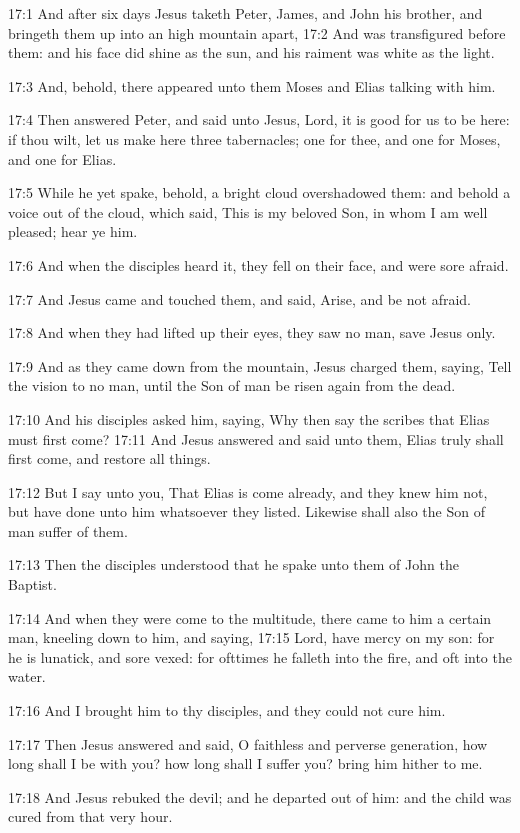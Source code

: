 17:1 And after six days Jesus taketh Peter, James, and John his
brother, and bringeth them up into an high mountain apart, 17:2 And
was transfigured before them: and his face did shine as the sun, and
his raiment was white as the light.

17:3 And, behold, there appeared unto them Moses and Elias talking
with him.

17:4 Then answered Peter, and said unto Jesus, Lord, it is good for us
to be here: if thou wilt, let us make here three tabernacles; one for
thee, and one for Moses, and one for Elias.

17:5 While he yet spake, behold, a bright cloud overshadowed them: and
behold a voice out of the cloud, which said, This is my beloved Son,
in whom I am well pleased; hear ye him.

17:6 And when the disciples heard it, they fell on their face, and
were sore afraid.

17:7 And Jesus came and touched them, and said, Arise, and be not
afraid.

17:8 And when they had lifted up their eyes, they saw no man, save
Jesus only.

17:9 And as they came down from the mountain, Jesus charged them,
saying, Tell the vision to no man, until the Son of man be risen again
from the dead.

17:10 And his disciples asked him, saying, Why then say the scribes
that Elias must first come?  17:11 And Jesus answered and said unto
them, Elias truly shall first come, and restore all things.

17:12 But I say unto you, That Elias is come already, and they knew
him not, but have done unto him whatsoever they listed. Likewise shall
also the Son of man suffer of them.

17:13 Then the disciples understood that he spake unto them of John
the Baptist.

17:14 And when they were come to the multitude, there came to him a
certain man, kneeling down to him, and saying, 17:15 Lord, have mercy
on my son: for he is lunatick, and sore vexed: for ofttimes he falleth
into the fire, and oft into the water.

17:16 And I brought him to thy disciples, and they could not cure him.

17:17 Then Jesus answered and said, O faithless and perverse
generation, how long shall I be with you? how long shall I suffer you?
bring him hither to me.

17:18 And Jesus rebuked the devil; and he departed out of him: and the
child was cured from that very hour.


